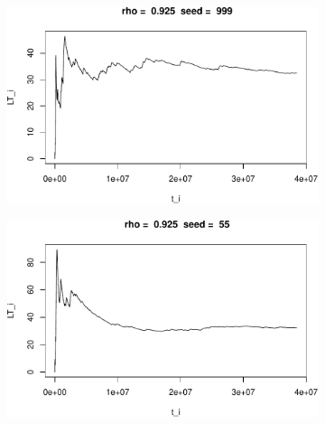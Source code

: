 \documentclass[]{article}
\begin{document}
\begin{figure}[h!]
\begin{subfigure}[b]{.55\linewidth}
\includegraphics[width=\linewidth]{003_files/figure-latex/unnamed-chunk-22-5.pdf}
\end{subfigure}\hfill
\begin{subfigure}[b]{.55\linewidth}
\includegraphics[width=\linewidth]{003_files/figure-latex/unnamed-chunk-22-6.pdf}
\end{subfigure}\vfill
\end{figure}
\end{document}
